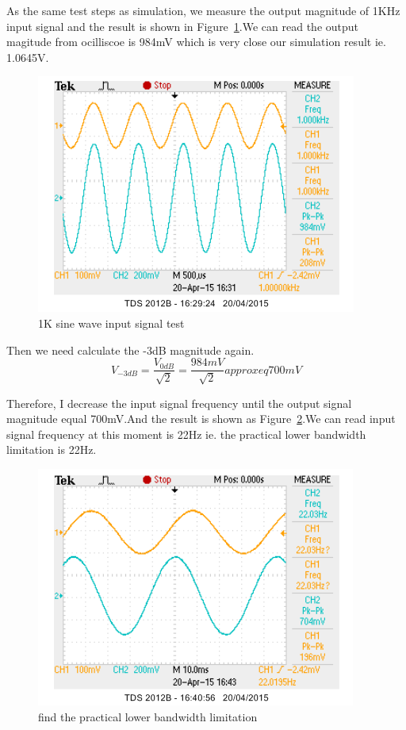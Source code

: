 As the same test steps as simulation, we measure the output magnitude of 1KHz input signal and the result is shown in Figure~\ref{fig:1K sine wave input signal test}.We can read the output magitude from ocilliscoe is 984mV which is very close our simulation result ie. 1.0645V.

\begin{figure}[htbp]
\centering
\includegraphics[scale=1]{"../Photo/Chap7/1ksine"}
\caption{1K sine wave input signal test}
\label{fig:1K sine wave input signal test}
\end{figure}

Then we need calculate the -3dB magnitude again.
\[ V_{-3dB}=\frac{V_{0dB}}{\sqrt{2}}=\frac{984mV}{\sqrt{2}}approxeq 700 mV\]

Therefore, I decrease the input signal frequency until the output signal magnitude equal 700mV.And the result is shown as Figure~\ref{fig:find the practical lower bandwidth limitation}.We can read input signal frequency at this moment is 22Hz ie. the practical lower bandwidth limitation is 22Hz.
\begin{figure}[htbp]
\centering
\includegraphics[scale=1]{"../Photo/Chap7/lower band"}
\caption{find the practical lower bandwidth limitation}
\label{fig:find the practical lower bandwidth limitation}
\end{figure}

